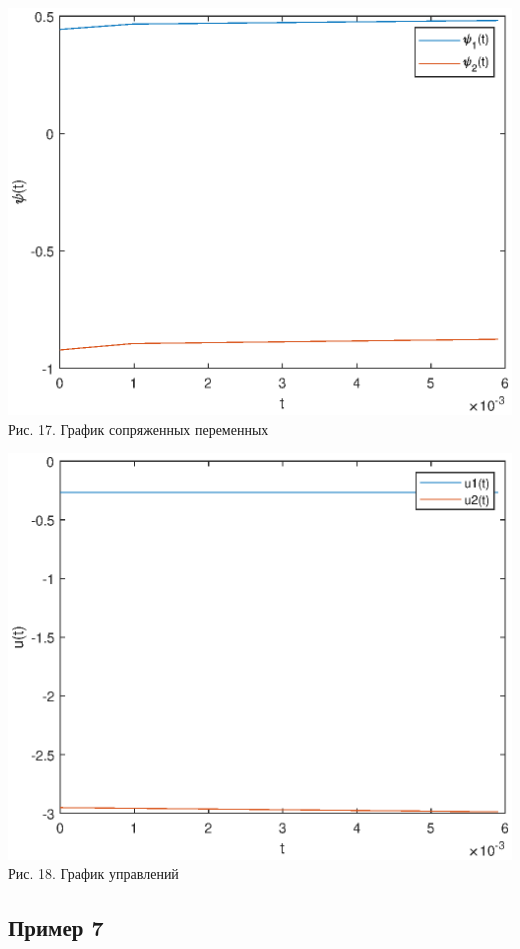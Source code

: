 \documentclass{article}
\theoremstyle{definition}
\begin{document}
\begin{center}
{\includegraphics[width=15cm]{pexample6.eps}}
{Рис. 17. График сопряженных переменных}
\end{center}

\begin{center}
{\includegraphics[width=15cm]{uexample6.eps}}
{Рис. 18. График управлений}
\end{center}

\newpage

\subsection{Пример 7}
\end{document}
